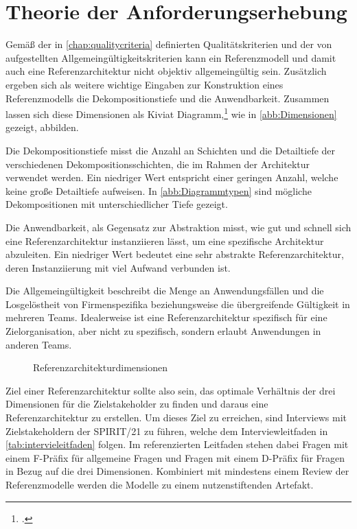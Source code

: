 \section{Theorie der Anforderungserhebung}\label{chap:requirements}

Gemäß der in \autoref{chap:qualitycriteria} definierten Qualitätskriterien und der von \citeauthor{vomBrocke.2003} aufgestellten Allgemeingültigkeitskriterien kann ein Referenzmodell und damit auch eine Referenzarchitektur nicht objektiv allgemeingültig sein. Zusätzlich ergeben sich als weitere wichtige Eingaben zur Konstruktion eines Referenzmodells die Dekompositionstiefe und die Anwendbarkeit. Zusammen lassen sich diese Dimensionen als Kiviat Diagramm,\footcite[Vgl.][33\psqq]{Kolence.1973} wie in \autoref{abb:Dimensionen} gezeigt, abbilden. 

Die Dekompositionstiefe misst die Anzahl an Schichten und die Detailtiefe der verschiedenen Dekompositionsschichten, die im Rahmen der Architektur verwendet werden. Ein niedriger Wert entspricht einer geringen Anzahl, welche keine große Detailtiefe aufweisen. In \autoref{abb:Diagrammtypen} sind mögliche Dekompositionen mit unterschiedlicher Tiefe gezeigt. 

Die Anwendbarkeit, als Gegensatz zur Abstraktion misst, wie gut und schnell sich eine Referenzarchitektur instanziieren lässt, um eine spezifische Architektur abzuleiten. Ein niedriger Wert bedeutet eine sehr abstrakte Referenzarchitektur, deren Instanziierung mit viel Aufwand verbunden ist. 

Die Allgemeingültigkeit beschreibt die Menge an Anwendungsfällen und die Losgelöstheit von Firmenspezifika beziehungsweise die übergreifende Gültigkeit in mehreren Teams. Idealerweise ist eine Referenzarchitektur spezifisch für eine Zielorganisation, aber nicht zu spezifisch, sondern erlaubt Anwendungen in anderen Teams.

\begin{figure}[H]
\centering
{}

\caption{Referenzarchitekturdimensionen}
\label{abb:Dimensionen}
\end{figure}

Ziel einer Referenzarchitektur sollte also sein, das optimale Verhältnis der drei Dimensionen für die Zielstakeholder zu finden und daraus eine Referenzarchitektur zu erstellen. Um dieses Ziel zu erreichen, sind Interviews mit Zielstakeholdern der SPIRIT/21 zu führen, welche dem Interviewleitfaden in \autoref{tab:intervieleitfaden} folgen. Im referenzierten Leitfaden stehen dabei Fragen mit einem F-Präfix für allgemeine Fragen und Fragen mit einem D-Präfix für Fragen in Bezug auf die drei Dimensionen. Kombiniert mit mindestens einem Review der Referenzmodelle werden die Modelle zu einem nutzenstiftenden Artefakt.




